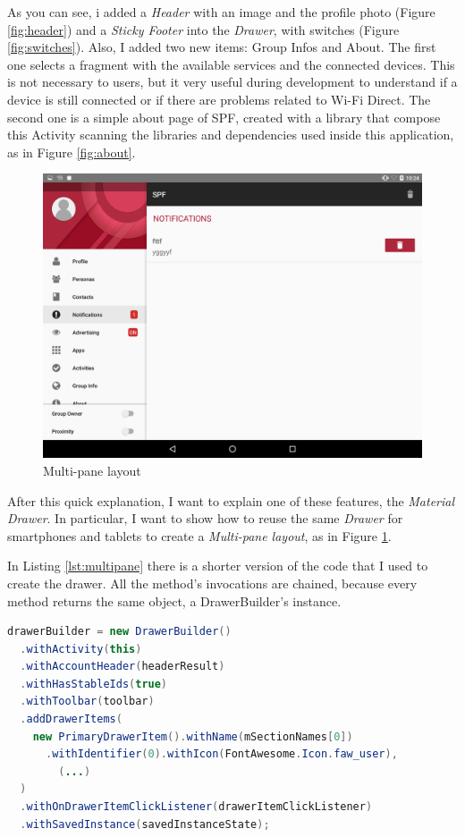 As you can see, i added a \emph{Header} with an image and the profile photo (Figure \ref{fig:header}) and a \emph{Sticky Footer} into the \emph{Drawer}, with switches (Figure \ref{fig:switches}). Also, I added two new items: \textsf{Group Infos} and \textsf{About}. The first one selects a fragment with the available services and the connected devices. This is not necessary to users, but it very useful during development to understand if a device is still connected or if there are problems related to Wi-Fi Direct. The second one is a simple about page of SPF, created with a library that compose this Activity scanning the libraries and dependencies used inside this application, as in Figure \ref{fig:about}.

\begin{figure}[thpb]
	\centering
	\includegraphics[scale=0.15]{./images/chap3/tablet1.png}
	\caption{Multi-pane layout}
	\label{fig:tablet1}
\end{figure}	


After this quick explanation, I want to explain one of these features, the 	\emph{Material Drawer}. In particular, I want to show how to reuse the same \emph{Drawer} for smartphones and tablets to create a \emph{Multi-pane layout}, as in Figure \ref{fig:tablet1}.

In Listing \ref{lst:multipane} there is a shorter version of the code that I used to create the drawer. All the method's invocations are chained, because every method returns the same object, a \textsf{DrawerBuilder}'s instance.


\begin{lstlisting}[caption={DrawerBuilder creations},label=lst:drawerbuilder, language=Java]
drawerBuilder = new DrawerBuilder()
  .withActivity(this)
  .withAccountHeader(headerResult)
  .withHasStableIds(true)
  .withToolbar(toolbar)
  .addDrawerItems(
    new PrimaryDrawerItem().withName(mSectionNames[0])
      .withIdentifier(0).withIcon(FontAwesome.Icon.faw_user),
    	(...)
  )
  .withOnDrawerItemClickListener(drawerItemClickListener)
  .withSavedInstance(savedInstanceState);
\end{lstlisting}


